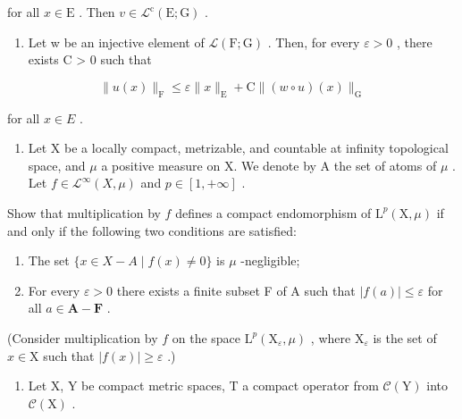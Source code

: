 for all \(x\in \mathrm{E}\) . Then \(v\in \mathcal{L}^{\mathrm{c}}(\mathrm{E};\mathrm{G})\) .

\begin{enumerate}
\def\labelenumi{\alph{enumi})}
\setcounter{enumi}{1}
\tightlist
\item
  Let w be an injective element of \(\mathcal{L}(\mathrm{F};\mathrm{G})\) . Then, for every \(\varepsilon > 0\) , there exists C \textgreater{} 0 such that
\end{enumerate}

\[
\| u (x) \| _ {\mathrm{F}} \leqslant \varepsilon \| x \| _ {\mathrm{E}} + \mathrm{C} \| (w \circ u) (x) \| _ {\mathrm{G}}
\]

for all \(x \in E\) .

\begin{enumerate}
\def\labelenumi{\arabic{enumi})}
\setcounter{enumi}{18}
\tightlist
\item
  Let X be a locally compact, metrizable, and countable at infinity topological space, and \(\mu\) a positive measure on X. We denote by A the set of atoms of \(\mu\) . Let \(f \in \mathcal{L}^{\infty}(X, \mu)\) and \(p \in [1, +\infty]\) .
\end{enumerate}

Show that multiplication by \(f\) defines a compact endomorphism of \(\mathrm{L}^{p}(\mathrm{X},\mu)\) if and only if the following two conditions are satisfied:

\begin{enumerate}
\def\labelenumi{(\roman{enumi})}
\item
  The set \(\{x\in X-A\mid f(x)\neq0\}\) is \(\mu\) -negligible;
\item
  For every \(\varepsilon > 0\) there exists a finite subset F of A such that \(|f(a)| \leqslant \varepsilon\) for all \(a \in \mathbf{A} - \mathbf{F}\) .
\end{enumerate}

(Consider multiplication by \(f\) on the space \(\mathrm{L}^{p}(\mathrm{X}_{\varepsilon},\mu)\) , where \(\mathrm{X}_{\varepsilon}\) is the set of \(x\in\mathrm{X}\) such that \(|f(x)|\geqslant\varepsilon\) .)

\begin{enumerate}
\def\labelenumi{\arabic{enumi})}
\setcounter{enumi}{19}
\tightlist
\item
  Let X, Y be compact metric spaces, T a compact operator from \(\mathcal{C}(\mathrm{Y})\) into \(\mathcal{C}(\mathrm{X})\) .
\end{enumerate}

